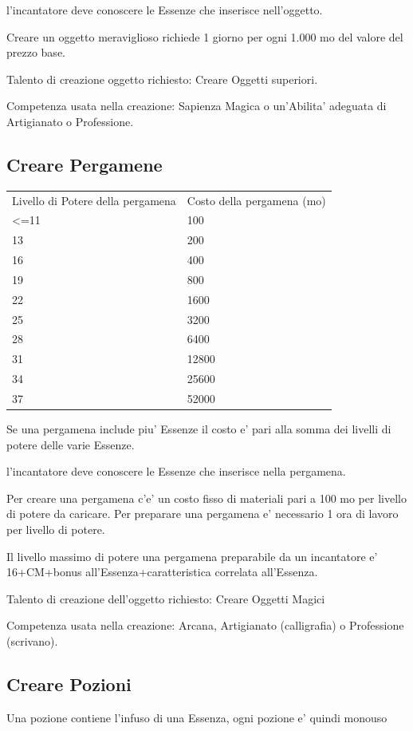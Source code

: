 \documentclass[a4paper,11pt,twoside,openany]{dndbook}
\begin{document}
{l'incantatore deve conoscere le Essenze che inserisce nell'oggetto.

Creare un oggetto meraviglioso richiede 1 giorno per ogni 1.000 mo del valore del prezzo base.

Talento di creazione oggetto richiesto: Creare Oggetti superiori.

Competenza usata nella creazione: Sapienza Magica o un'Abilita' adeguata
di Artigianato o Professione.

\subsection{Creare Pergamene}

\begin{tabular}[c]{@{}ll@{}}
\toprule 
Livello di Potere della pergamena & Costo della pergamena (mo)\tabularnewline
\textless=11 & 100\tabularnewline
13 & 200\tabularnewline
16 & 400\tabularnewline
19 & 800\tabularnewline
22 & 1600\tabularnewline
25 & 3200\tabularnewline
28 & 6400\tabularnewline
31 & 12800\tabularnewline
34 & 25600\tabularnewline
37 & 52000\tabularnewline
\bottomrule
\end{tabular}

\bigskip

Se una pergamena include piu' Essenze il costo e' pari alla somma dei livelli di potere delle varie Essenze.

l'incantatore deve conoscere le Essenze che inserisce nella pergamena.

Per creare una pergamena c'e' un costo fisso di materiali pari a 100 mo per livello di potere da caricare. Per preparare una pergamena e' necessario 1 ora di lavoro per livello di potere.

Il livello massimo di potere una pergamena preparabile da un incantatore e' 16+CM+bonus all'Essenza+caratteristica correlata all'Essenza.

Talento di creazione dell'oggetto richiesto: Creare Oggetti Magici

Competenza usata nella creazione: Arcana, Artigianato (calligrafia) o Professione (scrivano).

\subsection{Creare Pozioni}

Una pozione contiene l'infuso di una Essenza, ogni pozione e' quindi monouso

}
\end{document}

